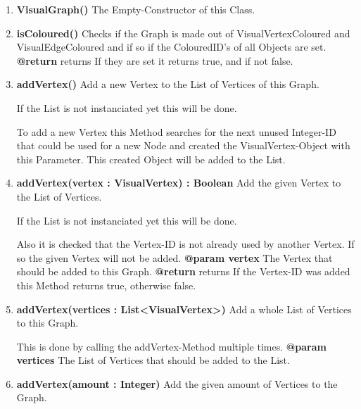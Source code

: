 \documentclass{article}
\begin{document}
				\begin{enumerate}[+]
					\item{
						\textbf{VisualGraph()} \newline
						The Empty-Constructor of this Class.
						\newline
					}
					\item{
						\textbf{isColoured()} \newline
						Checks if the Graph is made out of VisualVertexColoured and VisualEdgeColoured and if so if the ColouredID's of all Objects are set.
						\newline
						\textbf{@return} returns
							If they are set it returns true, and if not false.
							\newline
					}
					\item{
						\textbf{addVertex()} \newline
						Add a new Vertex to the List of Vertices of this Graph.
						
						If the List is not instanciated yet this will be done.
						
						To add a new Vertex this Method searches for the next unused Integer-ID that could be used for a new Node and created the VisualVertex-Object with this Parameter.
						This created Object will be added to the List.
						\newline
					}
					\item{
						\textbf{addVertex(vertex : VisualVertex) : Boolean} \newline
						Add the given Vertex to the List of Vertices.
						
						If the List is not instanciated yet this will be done.
						
						Also it is checked that the Vertex-ID is not already used by another Vertex.
						If so the given Vertex will not be added.
						\newline
						\textbf{@param vertex}
							The Vertex that should be added to this Graph.
							\newline
						\textbf{@return} returns
							If the Vertex-ID was added this Method returns true, otherwise false.
							\newline
					}
					\item{
						\textbf{addVertex(vertices : List<VisualVertex>)} \newline
						Add a whole List of Vertices to this Graph.
						
						This is done by calling the addVertex-Method multiple times.
						\newline
						\textbf{@param vertices}
							The List of Vertices that should be added to the List.
							\newline
					}
					\item{
						\textbf{addVertex(amount : Integer)} \newline
						Add the given amount of Vertices to the Graph.
						
}
\end{enumerate}
\end{document}
